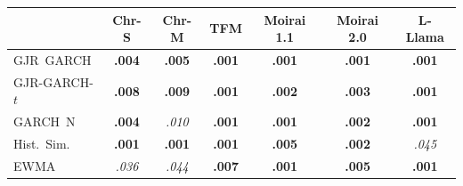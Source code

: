 \begin{tabular}{@{}lcccccc@{}}
\toprule
 & Chr-S & Chr-M & TFM & Moirai 1.1 & Moirai 2.0 & L-Llama \\
\midrule
GJR~GARCH & \textbf{.004} & \textbf{.005} & \textbf{.001} & \textbf{.001} & \textbf{.001} & \textbf{.001} \\
GJR-GARCH-$t$ & \textbf{.008} & \textbf{.009} & \textbf{.001} & \textbf{.002} & \textbf{.003} & \textbf{.001} \\
GARCH~N & \textbf{.004} & \textit{.010} & \textbf{.001} & \textbf{.001} & \textbf{.002} & \textbf{.001} \\
Hist.\ Sim. & \textbf{.001} & \textbf{.001} & \textbf{.001} & \textbf{.005} & \textbf{.002} & \textit{.045} \\
EWMA & \textit{.036} & \textit{.044} & \textbf{.007} & \textbf{.001} & \textbf{.005} & \textbf{.001} \\
\bottomrule
\end{tabular}
